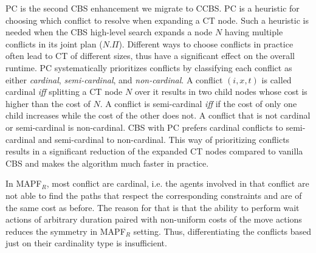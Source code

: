 \documentclass[letterpaper]{article} %
\newcommand{\cbs}{\ac{CBS}\xspace}
\newcommand{\icbs}{\ac{ICBS}\xspace}
\newcommand{\ccbs}{\ac{CCBS}\xspace}
\newcommand{\ct}{\ac{CT}\xspace}
\newcommand{\mapfr}{{MAPF}$_R$\xspace}
\newcommand{\pc}{\ac{PC}\xspace}
\begin{document}

\acf{PC} is the second \cbs enhancement we migrate to \ccbs. 
\pc is a heuristic for choosing which conflict to resolve when expanding a \ct node. 
Such a heuristic is needed when the \cbs high-level search expands a node $N$ having multiple conflicts in its joint plan ($N.\Pi$). %
Different ways to choose conflicts in practice often lead to \ct of different sizes, 
thus have a significant effect on the overall runtime. 
\pc systematically prioritizes conflicts by classifying each conflict as either \emph{cardinal}, \emph{semi-cardinal}, and \emph{non-cardinal}. 
A conflict $(i,x,t)$ is called cardinal \emph{iff} splitting a \ct node $N$ over it results in two child nodes
whose cost is higher than the cost of $N$. 
A conflict is semi-cardinal \emph{iff} if the cost of only one child increases while the cost of the other does not. 
A conflict that is not cardinal or semi-cardinal is non-cardinal. 
\cbs with \pc prefers cardinal conflicts to semi-cardinal and semi-cardinal to non-cardinal.  
This way of prioritizing conflicts results in a significant reduction of the expanded \ct nodes compared to vanilla \cbs and makes the algorithm much faster in practice.


In \mapfr, most conflict are cardinal, i.e. the agents involved in that conflict are not able to find the paths that respect the corresponding constraints and are of the same cost as before. The reason for that is that the ability to perform wait actions of arbitrary duration paired with non-uniform costs of the move actions reduces the symmetry in \mapfr setting. 
Thus, differentiating the conflicts based just on their cardinality type is insufficient.
\end{document}
